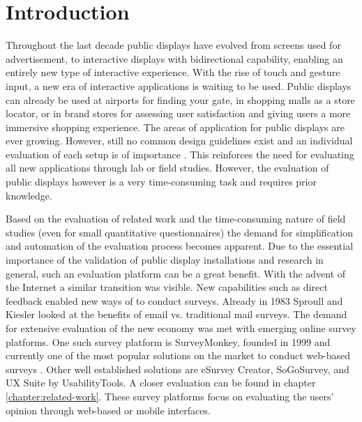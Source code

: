 \section{Introduction}
\label{sec:introduction}

	Throughout the last decade public displays have evolved from screens used for advertisement, to interactive displays with bidirectional capability, enabling an entirely new type of interactive experience. With the rise of touch and gesture input, a new era of interactive applications is waiting to be used. Public displays can already be used at airports for finding your gate, in shopping malls as a store locator, or in brand stores for assessing user satisfaction and giving users a more immersive shopping experience. The areas of application for public displays are ever growing. However, still no common design guidelines exist \cite{Alt2012HowToEvaluate} and an individual evaluation of each setup is of importance \cite{muller2010requirements}. This reinforces the need for evaluating all new applications through lab or field studies. However, the evaluation of public displays however is a very time-consuming task and requires prior knowledge. 


	Based on the evaluation of related work and the time-consuming nature of field studies (even for small quantitative questionnaires) the demand for simplification and automation of the evaluation process becomes apparent. Due to the essential importance of the validation of public display installations and research in general, such an evaluation platform can be a great benefit. 
	With the advent of the Internet a similar transition was visible. 
	New capabilities such as direct feedback enabled new ways of to conduct surveys. Already in 1983 Sproull and Kiesler \cite{sproull1986reducing} looked at the benefits of email vs. traditional mail surveys. The demand for extensive evaluation of the new economy was met with emerging online survey platforms. One such survey platform is SurveyMonkey, founded in 1999 and currently one of the most popular solutions on the market to conduct web-based surveys \cite{SurveyMonkeyAboutUs}. Other well established solutions are eSurvey Creator, SoGoSurvey, and UX Suite by UsabilityTools. A closer evaluation can be found in chapter \ref{chapter:related-work}. These survey platforms focus on evaluating the users' opinion through web-based or mobile interfaces. 


